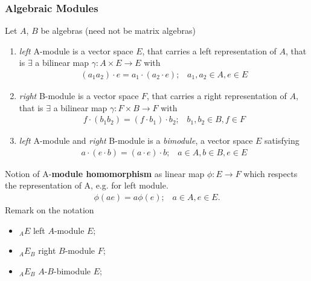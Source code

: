 \subsubsection{Algebraic Modules}
\begin{definition}
    Let $A$, $B$ be algebras (need not be matrix algebras)
    \begin{enumerate}
        \item \textit{left} A-module is a vector space $E$, that carries a left representation of $A$,
            that is $\exists$ a bilinear map $\gamma: A \times E \rightarrow E$ with
            \begin{align}
                (a_1a_2)\cdot e = a_1 \cdot (a_2 \cdot e);\;\;\; a_1, a_2 \in A, e \in E
            \end{align}
        \item \textit{right} B-module is a vector space $F$, that carries a right representation of $A$,
            that is $\exists$ a bilinear map $\gamma: F \times B \rightarrow F$ with
            \begin{align}
                f \cdot (b_1b_2)= (f \cdot b_1) \cdot b_2;\;\;\; b_1, b_2 \in B, f \in F
            \end{align}
        \item \textit{left} A-module and \textit{right} B-module is a \textit{bimodule}, a vector space $E$
            satisfying
            \begin{align}
                a \cdot (e \cdot b)= (a \cdot e) \cdot b;\;\;\;  a \in A, b \in B, e \in E
            \end{align}
    \end{enumerate}
\end{definition}
Notion of A-\textbf{module homomorphism} as linear map $\phi: E\rightarrow F$ which respects the
representation of A, e.g. for left module.
\begin{align}
    \phi (ae) = a \phi (e); \;\;\; a \in A, e \in E.
\end{align}
Remark on the notation
\begin{itemize}
    \item ${}_A E$ left $A$-module $E$;
    \item ${}_A E_B$ right $B$-module $F$;
    \item ${}_A E_B$ $A$-$B$-bimodule $E$;
\end{itemize}

